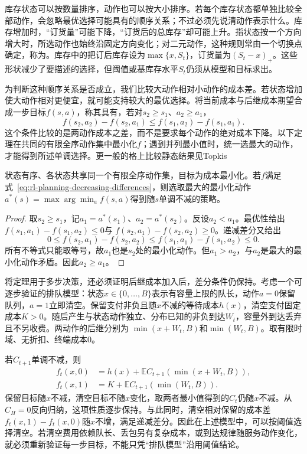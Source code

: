库存状态可以按数量排序，动作也可以按大小排序。若每个库存状态都单独比较全部动作，会忽略最优选择可能具有的顺序关系；不过必须先说清动作表示什么。库存增加时，“订货量”可能下降，“订货后的总库存”却可能上升。指状态按一个方向增大时，所选动作也始终沿固定方向变化；对二元动作，这种规则常由一个切换点确定，称为。库存中的把订后库存设为$\max\{x,S_t\}$，订货量为$(S_t-x)_+$。这些形状减少了要描述的选择，但阈值或基库存水平$S_t$仍须从模型和目标求出。

为判断这种顺序关系是否成立，我们比较大动作相对小动作的成本差。若状态增加使大动作相对更便宜，就可能支持较大的最优选择。将当前成本与后继成本期望合成一步目标$f(s,a)$，称其具有，若对$s_2\geq s_1$、$a_2\geq a_1$，
\begin{equation}
 f(s_2,a_2)-f(s_2,a_1)
 \leq f(s_1,a_2)-f(s_1,a_1).
 \label{eq:rl-planning-decreasing-differences}
\end{equation}
这个条件比较的是两动作成本之差，而不是要求每个动作的绝对成本下降。以下定理在共同的有限全序动作集中最小化$f$；遇到并列最小值时，统一选最大的动作，才能得到所述单调选择。更一般的格上比较静态结果见Topkis

\begin{theorem}[递减差分给出单调最优动作]
 \label{thm:rl-planning-monotone}
 状态有序、各状态共享同一个有限全序动作集，目标为成本最小化。若$f$满足式~\eqref{eq:rl-planning-decreasing-differences}，则选取最大的最小化动作
 $a^*(s)=\max\arg\min_a f(s,a)$得到随$s$单调不减的策略。
\end{theorem}
\begin{proof}
 取$s_2\geq s_1$，记$a_1=a^*(s_1)$、$a_2=a^*(s_2)$。反设$a_2<a_1$。最优性给出
 $f(s_1,a_1)-f(s_1,a_2)\leq0$与
 $f(s_2,a_1)-f(s_2,a_2)\geq0$。递减差分又给出
 \[
 0\leq f(s_2,a_1)-f(s_2,a_2)
 \leq f(s_1,a_1)-f(s_1,a_2)\leq0.
 \]
 所有不等式只能取等号，故$a_1$也是$s_2$处的最小化动作。但$a_1>a_2$，与$a_2$是最大的最小化动作矛盾。因此$a_2\geq a_1$。
\end{proof}

将定理用于多步决策，还必须证明后继成本加入后，差分条件仍保持。考虑一个可逐步验证的排队模型：状态$x\in\{0,\ldots,B\}$表示有容量上限的队长，动作$a=0$保留队列，$a=1$立即清空。保留支付非负且随$x$不减的等待成本$h(x)$，清空支付固定成本$K>0$。随后产生与状态动作独立、分布已知的非负到达$W_t$，容量外到达丢弃且不另收费。两动作的后继分别为
$\min(x+W_t,B)$和$\min(W_t,B)$。取有限时域、无折扣、终端成本0。

若$C_{t+1}$单调不减，则
\[
 \begin{aligned}
 f_t(x,0)&=h(x)+\mathbb E C_{t+1}(\min(x+W_t,B)),\\
 f_t(x,1)&=K+\mathbb E C_{t+1}(\min(W_t,B)).
 \end{aligned}
 \]
保留目标随$x$不减，清空目标不随$x$变化，取两者最小值得到的$C_t$仍随$x$不减。从$C_H=0$反向归纳，这项性质逐步保持。与此同时，清空相对保留的成本差$f_t(x,1)-f_t(x,0)$随$x$不增，满足递减差分。因此在上述模型中，可以按阈值选择清空。若清空费用依赖队长、丢包另有复杂成本，或到达规律随服务动作变化，就必须重新验证每一步目标，不能只凭“排队模型”沿用阈值结论。

